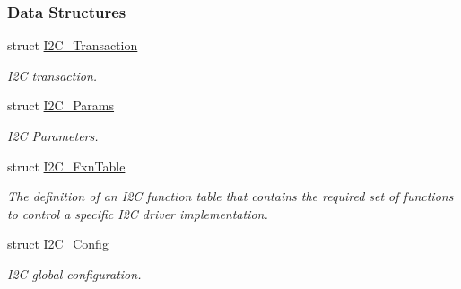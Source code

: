 \subsubsection*{Data Structures}
\begin{DoxyCompactItemize}
\item 
struct \hyperlink{struct_i2_c___transaction}{I2\+C\+\_\+\+Transaction}
\begin{DoxyCompactList}\small\item\em I2\+C transaction. \end{DoxyCompactList}\item 
struct \hyperlink{struct_i2_c___params}{I2\+C\+\_\+\+Params}
\begin{DoxyCompactList}\small\item\em I2\+C Parameters. \end{DoxyCompactList}\item 
struct \hyperlink{struct_i2_c___fxn_table}{I2\+C\+\_\+\+Fxn\+Table}
\begin{DoxyCompactList}\small\item\em The definition of an I2\+C function table that contains the required set of functions to control a specific I2\+C driver implementation. \end{DoxyCompactList}\item 
struct \hyperlink{struct_i2_c___config}{I2\+C\+\_\+\+Config}
\begin{DoxyCompactList}\small\item\em I2\+C global configuration. \end{DoxyCompactList}\end{DoxyCompactItemize}
